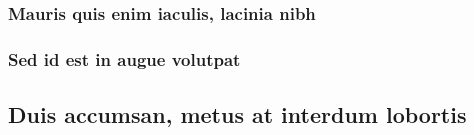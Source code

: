 \documentclass[%
  english,%
]{doctorate}
\begin{document}
\lipsum[1-8]

\subsubsection{Mauris quis enim iaculis, lacinia nibh}

\lipsum[1-8]

\subsubsection{Sed id est in augue volutpat}

\lipsum[1-8]

\subsection{Duis accumsan, metus at interdum lobortis}

\lipsum[1-8]
\end{document}
